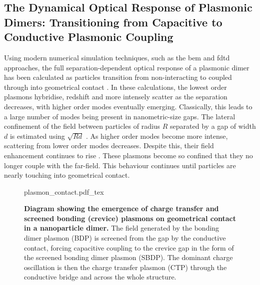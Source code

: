 \documentclass{article}
\begin{document}
\FloatBarrier
\subsection{The Dynamical Optical Response of Plasmonic Dimers: Transitioning from Capacitive to Conductive Plasmonic Coupling}

Using modern numerical simulation techniques, such as the \gls{bem} and \gls{fdtd} approaches, the full separation-dependent optical response of a plasmonic dimer has been calculated as particles transition from non-interacting to coupled through into geometrical contact \cite{romero2006}. In these calculations, the lowest order plasmons hybridise, redshift and more intensely scatter as the separation decreases, with higher order modes eventually emerging. Classically, this leads to a large number of modes being present in nanometric-size gaps. The lateral confinement of the field between particles of radius $R$ separated by a gap of width $d$ is estimated using $\sqrt{Rd}$ \cite{romero2006}. As higher order modes become more intense, scattering from lower order modes decreases. Despite this, their field enhancement continues to rise \cite{esteban2012}. These plasmons become so confined that they no longer couple with the far-field. This behaviour continues until particles are nearly touching into geometrical contact. %

\begin{figure}[bt]
\centering
\fontsize{10pt}{1em}\selectfont
\def\svgwidth{0.65\textwidth}
{plasmon_contact.pdf_tex}
\caption[Diagram showing the emergence of charge transfer and screened bonding (crevice) plasmons on geometrical contact in a nanoparticle dimer]{\textbf{Diagram showing the emergence of charge transfer and screened bonding (crevice) plasmons on geometrical contact in a nanoparticle dimer.} The field generated by the bonding dimer plasmon (BDP) is screened from the gap by the conductive contact, forcing capacitive coupling to the crevice gap in the form of the screened bonding dimer plasmon (SBDP). The dominant charge oscillation is then the charge transfer plasmon (CTP) through the conductive bridge and across the whole structure.}
\label{fig:plasmon_contact}
\end{figure}
\end{document}
